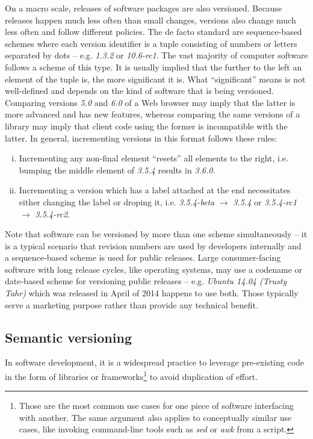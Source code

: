 \documentclass{l4proj}
\begin{document}
On a macro scale, releases of software packages are also versioned.
Because releases happen much less often than small changes, versions
also change much less often and follow different policies. The de
facto standard are sequence-based schemes where each version
identifier is a tuple consisting of numbers or letters separated by
dots -- e.g. \textit{1.3.2} or \textit{10.6-rc1}. The vast majority of
computer software follows a scheme of this type. It is usually implied
that the further to the left an element of the tuple is, the more
significant it is. What ``significant'' means is not well-defined and
depends on the kind of software that is being versioned. Comparing
versions \textit{5.0} and \textit{6.0} of a Web browser may imply that
the latter is more advanced and has new features, whereas comparing
the same versions of a library may imply that client code using the
former is incompatible with the latter. In general, incrementing
versions in this format follows these rules:
\begin{enumerate}[(i)]
\item Incrementing any non-final element ``resets'' all elements to
the right, i.e. bumping the middle element of \textit{3.5.4} results
in \textit{3.6.0}.
\item Incrementing a version which has a label attached at the end
necessitates either changing the label or droping it, i.e.
\textit{3.5.4-beta} $\rightarrow$ \textit{3.5.4} or \textit{3.5.4-rc1}
$\rightarrow $ \textit{3.5.4-rc2}.
\end{enumerate}

Note that software can be versioned by more than one scheme
simultaneously -- it is a
typical scenario that revision numbers are used by developers
internally and a sequence-based scheme is used for public releases.
Large consumer-facing software with long release cycles, like
operating systems, may use a codename or date-based scheme for
versioning public releases -- e.g. \textit{Ubuntu 14.04 (Trusty Tahr)}
which was released in April of 2014 happens to use both. Those
typically serve a marketing purpose rather than provide any technical
benefit.

\subsection{Semantic versioning}

In software development, it is a widespread practice to leverage
pre-existing code in the form of libraries or
frameworks\footnote{Those are the most common use cases for one piece
of software interfacing with another. The same argument also applies
to conceptually similar use cases, like invoking command-line tools
such as \textit{sed} or \textit{awk} from a script.} to avoid
duplication of effort.
\end{document}
